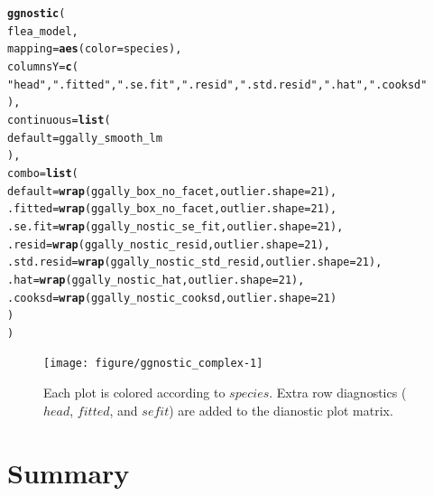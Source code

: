 \documentclass[stat,dissertation]{puthesis}\usepackage[]{graphicx}\usepackage{xcolor}
\makeatletter
\newcommand{\hlnum}[1]{\textcolor[rgb]{0.686,0.059,0.569}{#1}}%
\newcommand{\hlstr}[1]{\textcolor[rgb]{0.192,0.494,0.8}{#1}}%
\newcommand{\hlstd}[1]{\textcolor[rgb]{0.345,0.345,0.345}{#1}}%
\newcommand{\hlkwc}[1]{\textcolor[rgb]{0.333,0.667,0.333}{#1}}%
\newcommand{\hlkwd}[1]{\textcolor[rgb]{0.737,0.353,0.396}{\textbf{#1}}}%
\newenvironment{kframe}{%
 \def\at@end@of@kframe{}%
 \ifinner\ifhmode%
  \def\at@end@of@kframe{\end{minipage}}%
  \begin{minipage}{\columnwidth}%
 \fi\fi%
 \def\FrameCommand##1{\hskip\@totalleftmargin \hskip-\fboxsep
 \colorbox{shadecolor}{##1}\hskip-\fboxsep
     \hskip-\linewidth \hskip-\@totalleftmargin \hskip\columnwidth}%
 \MakeFramed {\advance\hsize-\width
   \@totalleftmargin\z@ \linewidth\hsize
   \@setminipage}}%
 {\par\unskip\endMakeFramed%
 \at@end@of@kframe}
\newenvironment{knitrout}{}{} %
\renewenvironment{knitrout}{\setstretch{1}}{}
\makeatother
\begin{document}
\newpage
\begin{knitrout}\small
{}\color{fgcolor}\begin{kframe}
\begin{alltt}
\hlkwd{ggnostic}\hlstd{(}
  \hlstd{flea_model,}
  \hlkwc{mapping} \hlstd{=} \hlkwd{aes}\hlstd{(}\hlkwc{color} \hlstd{= species),}
  \hlkwc{columnsY} \hlstd{=} \hlkwd{c}\hlstd{(}
    \hlstr{"head"}\hlstd{,} \hlstr{".fitted"}\hlstd{,} \hlstr{".se.fit"}\hlstd{,} \hlstr{".resid"}\hlstd{,} \hlstr{".std.resid"}\hlstd{,} \hlstr{".hat"}\hlstd{,} \hlstr{".cooksd"}
  \hlstd{),}
  \hlkwc{continuous} \hlstd{=} \hlkwd{list}\hlstd{(}
    \hlkwc{default} \hlstd{= ggally_smooth_lm}
  \hlstd{),}
  \hlkwc{combo} \hlstd{=} \hlkwd{list}\hlstd{(}
    \hlkwc{default} \hlstd{=} \hlkwd{wrap}\hlstd{(ggally_box_no_facet,} \hlkwc{outlier.shape} \hlstd{=} \hlnum{21}\hlstd{),}
    \hlkwc{.fitted} \hlstd{=} \hlkwd{wrap}\hlstd{(ggally_box_no_facet,} \hlkwc{outlier.shape} \hlstd{=} \hlnum{21}\hlstd{),}
    \hlkwc{.se.fit} \hlstd{=} \hlkwd{wrap}\hlstd{(ggally_nostic_se_fit,} \hlkwc{outlier.shape} \hlstd{=} \hlnum{21}\hlstd{),}
    \hlkwc{.resid} \hlstd{=} \hlkwd{wrap}\hlstd{(ggally_nostic_resid,} \hlkwc{outlier.shape} \hlstd{=} \hlnum{21}\hlstd{),}
    \hlkwc{.std.resid} \hlstd{=} \hlkwd{wrap}\hlstd{(ggally_nostic_std_resid,} \hlkwc{outlier.shape} \hlstd{=} \hlnum{21}\hlstd{),}
    \hlkwc{.hat} \hlstd{=} \hlkwd{wrap}\hlstd{(ggally_nostic_hat,} \hlkwc{outlier.shape} \hlstd{=} \hlnum{21}\hlstd{),}
    \hlkwc{.cooksd} \hlstd{=} \hlkwd{wrap}\hlstd{(ggally_nostic_cooksd,} \hlkwc{outlier.shape} \hlstd{=} \hlnum{21}\hlstd{)}
  \hlstd{)}
\hlstd{)}
\end{alltt}
\end{kframe}\begin{figure}[H]

{\centering \texttt{[image: figure/ggnostic\_complex-1]} 

}

\caption{Each plot is colored according to $species$.  Extra row diagnostics ($head$, $fitted$, and $se fit$) are added to the dianostic plot matrix.}\label{fig:ggnostic_complex}
\end{figure}


\end{knitrout}


\section{Summary}
\end{document}
